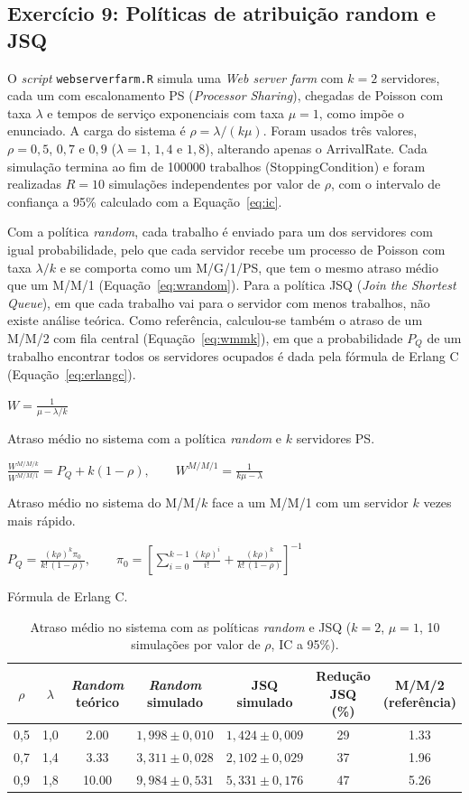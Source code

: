 \documentclass[10pt,a4paper]{article}
\newcommand{\formula}[3]{\begin{equacao}[H]\centering$\displaystyle #1$\caption{#2}\label{#3}\end{equacao}}
\begin{document}
\subsection{Exercício 9: Políticas de atribuição random e JSQ}

O \textit{script} \texttt{webserverfarm.R} simula uma \textit{Web server farm} com $k=2$ servidores, cada um com escalonamento PS (\textit{Processor Sharing}), chegadas de Poisson com taxa $\lambda$ e tempos de serviço exponenciais com taxa $\mu=1$, como impõe o enunciado. A carga do sistema é $\rho=\lambda/(k\mu)$. Foram usados três valores, $\rho=0{,}5$, $0{,}7$ e $0{,}9$ ($\lambda=1$, $1{,}4$ e $1{,}8$), alterando apenas o ArrivalRate. Cada simulação termina ao fim de \num{100000} trabalhos (StoppingCondition) e foram realizadas $R=10$ simulações independentes por valor de $\rho$, com o intervalo de confiança a 95\% calculado com a Equação~\ref{eq:ic}.

Com a política \textit{random}, cada trabalho é enviado para um dos servidores com igual probabilidade, pelo que cada servidor recebe um processo de Poisson com taxa $\lambda/k$ e se comporta como um M/G/1/PS, que tem o mesmo atraso médio que um M/M/1 (Equação~\ref{eq:wrandom}). Para a política JSQ (\textit{Join the Shortest Queue}), em que cada trabalho vai para o servidor com menos trabalhos, não existe análise teórica. Como referência, calculou-se também o atraso de um M/M/2 com fila central (Equação~\ref{eq:wmmk}), em que a probabilidade $P_Q$ de um trabalho encontrar todos os servidores ocupados é dada pela fórmula de Erlang C (Equação~\ref{eq:erlangc}).

\formula{W=\frac{1}{\mu-\lambda/k}}{Atraso médio no sistema com a política \textit{random} e $k$ servidores PS.}{eq:wrandom}

\formula{\frac{W^{M/M/k}}{W^{M/M/1}}=P_Q+k(1-\rho),\qquad W^{M/M/1}=\frac{1}{k\mu-\lambda}}{Atraso médio no sistema do M/M/$k$ face a um M/M/1 com um servidor $k$ vezes mais rápido.}{eq:wmmk}

\formula{P_Q=\frac{(k\rho)^k\pi_0}{k!\,(1-\rho)},\qquad \pi_0=\left[\sum_{i=0}^{k-1}\frac{(k\rho)^i}{i!}+\frac{(k\rho)^k}{k!\,(1-\rho)}\right]^{-1}}{Fórmula de Erlang C.}{eq:erlangc}

\begin{table}[H]
\centering
\begin{tabular}{ccS[table-format=2.2]ccS[table-format=2.0]S[table-format=1.2]}
\toprule
{$\rho$} & {$\lambda$} & {\textit{Random} teórico} & {\textit{Random} simulado} & {JSQ simulado} & {Redução JSQ (\%)} & {M/M/2 (referência)}\\
,5 & 1,0 & 2.00  & $1{,}998\pm0{,}010$ & $1{,}424\pm0{,}009$ & 29 & 1.33\\
0,7 & 1,4 & 3.33  & $3{,}311\pm0{,}028$ & $2{,}102\pm0{,}029$ & 37 & 1.96\\
0,9 & 1,8 & 10.00 & $9{,}984\pm0{,}531$ & $5{,}331\pm0{,}176$ & 47 & 5.26\\
\bottomrule
\end{tabular}
\caption{Atraso médio no sistema com as políticas \textit{random} e JSQ ($k=2$, $\mu=1$, 10 simulações por valor de $\rho$, IC a 95\%).}
\label{tab:ex09}
\end{table}
\end{document}
